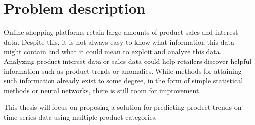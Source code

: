 
\section{Problem description}
\label{section:Introduction:ProblemDescription}
Online shopping platforms retain large amounts of product sales and interest data.
Despite this, it is not always easy to know what information this data might contain and what it could mean to exploit and analyze this data.
Analyzing product interest data or sales data could help retailers discover helpful information such as product trends or anomalies.
While methods for attaining such information already exist to some degree, in the form of simple statistical methods or neural networks,
there is still room for improvement.


This thesis will focus on proposing a solution for predicting product trends on time series data using multiple product categories.


